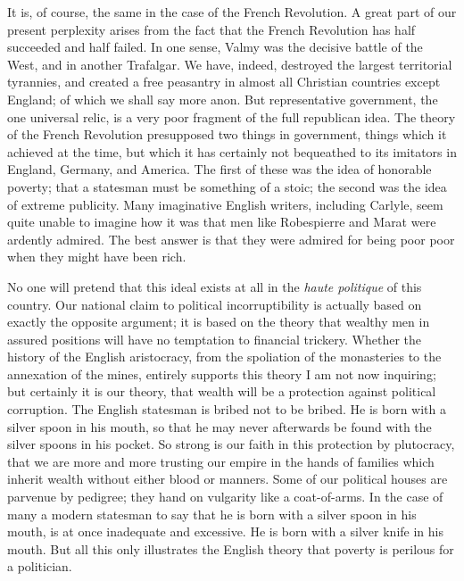 \documentclass{book}
\begin{document}
It is, of course, the same in the case of the French Revolution. A great part of our present perplexity arises from the fact that the French Revolution has half succeeded and half failed. In one sense, Valmy was the decisive battle of the West, and in another Trafalgar. We have, indeed, destroyed the largest territorial tyrannies, and created a free peasantry in almost all Christian countries except England; of which we shall say more anon. But representative government, the one universal relic, is a very poor fragment of the full republican idea. The theory of the French Revolution presupposed two things in government, things which it achieved at the time, but which it has certainly not bequeathed to its imitators in England, Germany, and America. The first of these was the idea of honorable poverty; that a statesman must be something of a stoic; the second was the idea of extreme publicity. Many imaginative English writers, including Carlyle, seem quite unable to imagine how it was that men like Robespierre and Marat were ardently admired. The best answer is that they were admired for being poor poor when they might have been rich.

No one will pretend that this ideal exists at all in the \emph{haute politique} of this country. Our national claim to political incorruptibility is actually based on exactly the opposite argument; it is based on the theory that wealthy men in assured positions will have no temptation to financial trickery. Whether the history of the English aristocracy, from the spoliation of the monasteries to the annexation of the mines, entirely supports this theory I am not now inquiring; but certainly it is our theory, that wealth will be a protection against political corruption. The English statesman is bribed not to be bribed. He is born with a silver spoon in his mouth, so that he may never afterwards be found with the silver spoons in his pocket. So strong is our faith in this protection by plutocracy, that we are more and more trusting our empire in the hands of families which inherit wealth without either blood or manners. Some of our political houses are parvenue by pedigree; they hand on vulgarity like a coat-of-arms. In the case of many a modern statesman to say that he is born with a silver spoon in his mouth, is at once inadequate and excessive. He is born with a silver knife in his mouth. But all this only illustrates the English theory that poverty is perilous for a politician.
\end{document}
